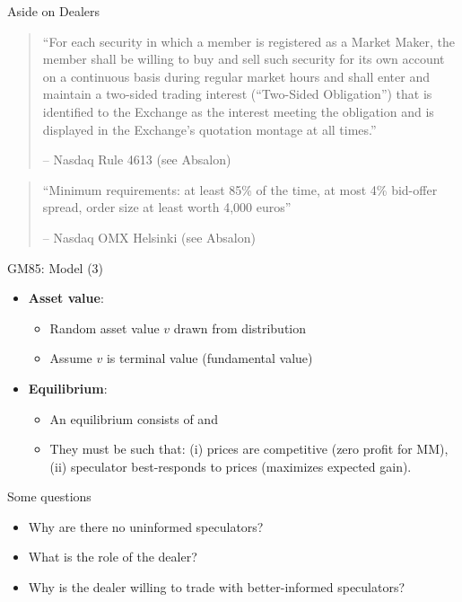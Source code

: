\begin{frame}{Aside on Dealers}
	\begin{quotation}
		\small ``For each security in which a member is registered as a Market Maker, the member shall be willing to buy and sell such security for its own account on a continuous basis during regular market hours and shall enter and maintain a two-sided trading interest (``Two-Sided Obligation'') that is identified to the Exchange as the interest meeting the obligation and is displayed in the Exchange's quotation montage at all times.''
		\begin{flushright}
			-- Nasdaq Rule 4613 (see Absalon)
		\end{flushright}
	\end{quotation}
	\vspace{3ex}
	\begin{quotation}
		\small ``Minimum requirements: at least 85\% of the time, at most 4\% bid-offer
		spread, order size at least worth 4,000 euros''
		\begin{flushright}
			-- Nasdaq OMX Helsinki (see Absalon)
		\end{flushright}
	\end{quotation}
\end{frame}


\begin{frame}{GM85: Model (3)}
\begin{itemize}
	\item \textbf{Asset value}:
	\begin{itemize}
		\item Random asset value $v$ drawn from distribution
		\item Assume $v$ is terminal value (fundamental value)
	\end{itemize}
	\item \textbf{Equilibrium}:
	\begin{itemize}
		\item An equilibrium consists of  and 
		\item They must be such that: (i) prices are competitive (zero profit for MM), (ii) speculator best-responds to prices (maximizes expected gain).
	\end{itemize}
\end{itemize}
\end{frame}


\begin{frame}{Some questions}
\begin{itemize}
	\item Why are there no uninformed speculators?
	\item What is the role of the dealer?
	\item Why is the dealer willing to trade with better-informed speculators?
\end{itemize}
\end{frame}


